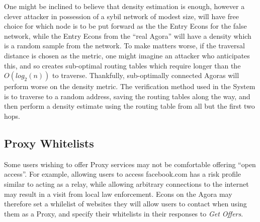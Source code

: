One might be inclined to believe that density estimation is enough, however a clever attacker in possession of a sybil network of modest size, will have free choice for which node is to be put forward as the the Entry Econs for the false network, while the Entry Econs from the ``real Agora'' will have a density which is a random sample from the network. To make matters worse, if the traversal distance is chosen as the metric, one might imagine an attacker who anticipates this, and so creates sub-optimal routing tables which require longer than the $O(log_2(n))$ to traverse. Thankfully, sub-optimally connected Agoras will perform worse on the density metric. The verification method used in the \Orchid{} System is to traverse to a random address, saving the routing tables along the way, and then perform a density estimate using the routing table from all but the first two hops.






\subsection{Proxy Whitelists}

Some users wishing to offer Proxy services may not be comfortable offering ``open access''. For example, allowing users to access facebook.com has a risk profile similar to acting as a relay, while allowing arbitrary connections to the internet may result in a visit from local law enforcement. Econs on the Agora may therefore set a whilelist of websites they will allow users to contact when using them as a Proxy, and specify their whitelists in their responses to \emph{Get Offers}.
